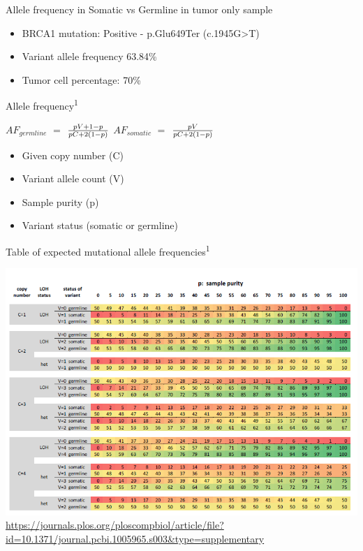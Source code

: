\documentclass[
  ignorenonframetext,
]{beamer}
\providecommand{\tightlist}{%
  \setlength{\itemsep}{0pt}\setlength{\parskip}{0pt}}
\begin{document}
\begin{frame}{Allele frequency in Somatic vs Germline in tumor only
sample}
\protect\hypertarget{allele-frequency-in-somatic-vs-germline-in-tumor-only-sample}{}

\begin{itemize}
\tightlist
\item
  BRCA1 mutation: Positive - p.Glu649Ter (c.1945G\textgreater{}T)\\
\item
  Variant allele frequency 63.84\%\\
\item
  Tumor cell percentage: 70\%
\end{itemize}

\end{frame}

\begin{frame}{Allele frequency\textsuperscript{1}}
\protect\hypertarget{allele-frequency-sun_2018_computational_ploscomputationalbiology}{}

\(AF_{germline}\) \(=\) \({pV+1-p} \over {pC+2(1-p)}\) \(AF_{somatic}\)
\(=\) \(pV \over pC+2(1-p)\)

\begin{itemize}
\tightlist
\item
  Given copy number (C)
\item
  Variant allele count (V)
\item
  Sample purity (p)
\item
  Variant status (somatic or germline)
\end{itemize}

\end{frame}

\begin{frame}{Table of expected mutational allele
frequencies\textsuperscript{1}}
\protect\hypertarget{table-of-expected-mutational-allele-frequencies-sun_2018_computational_ploscomputationalbiology}{}

\includegraphics{AF.png}
\url{https://journals.plos.org/ploscompbiol/article/file?id=10.1371/journal.pcbi.1005965.s003\&type=supplementary}

\end{frame}
\end{document}
